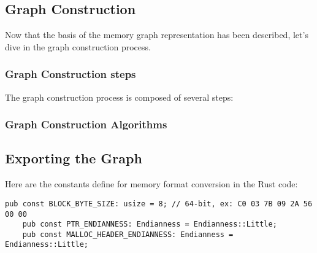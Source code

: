 \subsection{Graph Construction}
Now that the basis of the memory graph representation has been described, let's dive in the graph construction process. 

\subsubsection{Graph Construction steps}
The graph construction process is composed of several steps:

\begin{comment}
1. graph initialization
* loading a given heap dump file and its associated annotation file
* perform some checks on the annotation file, like checking if the annotation file is valid, that all annotations are present

2. graph building
* build the graph from heap dump byte blocks
* perform data structure detection step
* perform pointer detection step

3. graph annotation
* replace VN by KN from annotation file
* add other annotations like SSH_STRUCT
After this step, its possible to export the graph to a file, like a \texttt{.dot} file or a \texttt{.gv} file for visualization or other purposes.

4. Generate embedding from graph
different embedding are possible. We will focus on the semantic embedding which is a general way to embed the graph by addind the related graph structure and vicinity information to each node.
\end{comment}

\subsubsection{Graph Construction Algorithms}



\subsection{Exporting the Graph}


\begin{minipage}{\dimexpr\linewidth-20pt}
    Here are the constants define for memory format conversion in the Rust code:

   \begin{lstlisting}[style=rust, caption={Rust memory format constants in \textit{mem2graph}}]
    pub const BLOCK_BYTE_SIZE: usize = 8; // 64-bit, ex: C0 03 7B 09 2A 56 00 00
    pub const PTR_ENDIANNESS: Endianness = Endianness::Little;
    pub const MALLOC_HEADER_ENDIANNESS: Endianness = Endianness::Little;
   \end{lstlisting}
\end{minipage}

